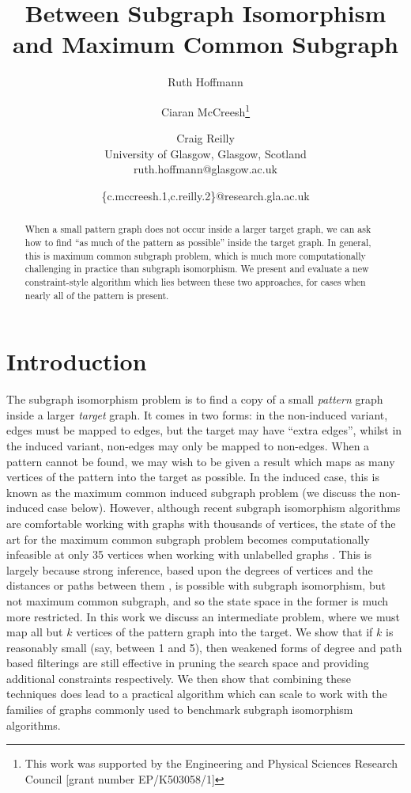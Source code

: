 \documentclass[letterpaper]{article}
\title{Between Subgraph Isomorphism and Maximum Common Subgraph}
\author{Ruth Hoffmann \and Ciaran McCreesh\thanks{This work was supported by the Engineering and Physical Sciences
Research Council [grant number EP/K503058/1]} \and Craig Reilly \\
University of Glasgow, Glasgow, Scotland \\
ruth.hoffmann@glasgow.ac.uk \and \{c.mccreesh.1,c.reilly.2\}@research.gla.ac.uk}
\newcommand{\citep}[1]{\cite{#1}}
\theoremstyle{definition}
\begin{document}
\maketitle

\begin{abstract}
    When a small pattern graph does not occur inside a larger target graph, we can ask how to find
    ``as much of the pattern as possible'' inside the target graph. In general, this is maximum
    common subgraph problem, which is much more computationally challenging in practice than
    subgraph isomorphism. We present and evaluate a new constraint-style algorithm which lies
    between these two approaches, for cases when nearly all of the pattern is present.
\end{abstract}

\section{Introduction}

The subgraph isomorphism problem is to find a copy of a small \emph{pattern} graph inside a larger
\emph{target} graph. It comes in two forms: in the non-induced variant, edges must be mapped to
edges, but the target may have ``extra edges'', whilst in the induced variant, non-edges may only be
mapped to non-edges. When a pattern cannot be found, we may wish to be given a result which maps as
many vertices of the pattern into the target as possible. In the induced case, this is known as the
maximum common induced subgraph problem (we discuss the non-induced case below). However, although
recent subgraph isomorphism algorithms are comfortable working with graphs with thousands of
vertices, the state of the art for the maximum common subgraph problem becomes computationally
infeasible at only 35 vertices when working with unlabelled graphs \citep{CP2016MCSPaper}. This is
largely because strong inference, based upon the degrees of vertices
\citep{DBLP:journals/ai/Solnon10} and the distances or paths between them
\citep{DBLP:conf/cp/AudemardLMGP14,DBLP:conf/cp/McCreeshP15}, is possible with subgraph isomorphism,
but not maximum common subgraph, and so the state space in the former is much more restricted. In
this work we discuss an intermediate problem, where we must map all but $k$ vertices of the pattern
graph into the target. We show that if $k$ is reasonably small (say, between 1 and 5), then weakened
forms of degree and path based filterings are still effective in pruning the search space and
providing additional constraints respectively. We then show that combining these techniques does
lead to a practical algorithm which can scale to work with the families of graphs commonly used to
benchmark subgraph isomorphism algorithms.
\end{document}

